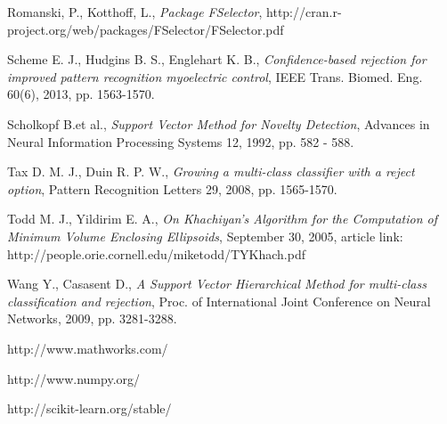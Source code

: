 \documentclass{llncs}
\begin{document}
\begin{thebibliography}{1}
Romanski, P., Kotthoff, L., \emph{Package FSelector}, http://cran.r-project.org/web/packages/FSelector/FSelector.pdf

Scheme E. J., Hudgins B. S., Englehart K. B., \emph{Confidence-based rejection for improved pattern recognition myoelectric control}, IEEE Trans. Biomed. Eng. 60(6), 2013, pp. 1563-1570.

Scholkopf B.et al., \emph{Support Vector Method for Novelty Detection}, Advances in Neural Information Processing Systems 12, 1992, pp. 582 - 588. 

Tax D. M. J., Duin R. P. W., \emph{Growing a multi-class classifier with a reject option}, Pattern Recognition Letters 29, 2008, pp. 1565-1570.

Todd M. J., Yildirim E. A., \emph{On Khachiyan's Algorithm for the Computation of Minimum Volume Enclosing Ellipsoids}, September 30, 2005, article link: http://people.orie.cornell.edu/miketodd/TYKhach.pdf

Wang Y., Casasent D., \emph{A Support Vector Hierarchical Method for multi-class classification and rejection}, Proc. of International Joint Conference on Neural Networks, 2009, pp. 3281-3288.

http://www.mathworks.com/

http://www.numpy.org/

http://scikit-learn.org/stable/

	

 
\end{thebibliography}
\end{document}
